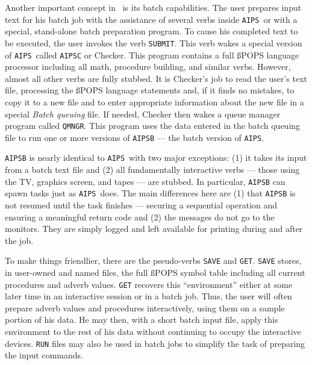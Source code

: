      Another important concept in \AIPS\ is its batch capabilities.
The user prepares input text for his batch job with the assistance of
several verbs inside {\tt AIPS}\ or with a special, stand-alone batch
preparation program.  To cause his completed text to be executed, the
user invokes the verb \hbox{{\tt SUBMIT}}.  This verb wakes a special version
of {\tt AIPS}\ called {\tt AIPSC} or Checker.  This program contains
a full {\ss POPS} language processor including all math, procedure building,
and similar verbs.  However, almost all other verbs are fully stubbed.
It is Checker's job to read the user's text file, processing the {\ss POPS}
language statements and, if it finds no mistakes, to copy it to a new
file and to enter appropriate information about the new file in a
special {\it Batch queuing} file.  If needed, Checker then wakes a
queue manager program called \hbox{{\tt QMNGR}}.  This program uses the
data entered in the batch queuing file to run one or more versions of
{\tt AIPSB} --- the batch version of \hbox{{\tt AIPS}}.

     {\tt AIPSB} is nearly identical to {\tt AIPS}\ with two major
exceptions: (1) it takes its input from a batch text file and (2) all
fundamentally interactive verbs --- those using the TV, graphics screen,
and tapes --- are stubbed. In particular, {\tt AIPSB} can spawn tasks
just as {\tt AIPS}\ does.  The main differences here are (1) that
{\tt AIPSB} is not resumed until the task finishes --- securing a
sequential operation and ensuring a meaningful return code and (2)
the messages do not go to the monitors.  They are simply logged and
left available for printing during and after the job.

     To make things friendlier, there are the pseudo-verbs {\tt SAVE}
and \hbox{{\tt GET}}.  {\tt SAVE} stores, in user-owned and named files, the
full {\ss POPS} symbol table including all current procedures and adverb
values.  {\tt GET} recovers this ``environment'' either at some later
time in an interactive session or in a batch job.  Thus, the user will
often prepare adverb values and procedures interactively, using them
on a sample portion of his data.  He may then, with a short batch input
file, apply this environment to the rest of his data without continuing
to occupy the interactive devices.  {\tt RUN} files may also be used
in batch jobs to simplify the task of preparing the input commands.



